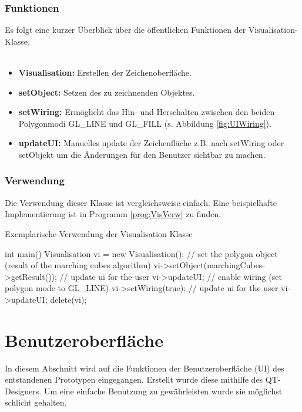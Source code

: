 \subsubsection{Funktionen}
Es folgt eine kurzer Überblick über die öffentlichen Funktionen der Visualisation-Klasse.\\
\\
\begin{itemize}
	\item \textbf{Visualisation:} Erstellen der Zeichenoberfläche.
	\item \textbf{setObject:} Setzen des zu zeichnenden Objektes.
	\item \textbf{setWiring:} Ermöglicht das Hin- und Herschalten zwischen den beiden Polygonmodi GL\_LINE und GL\_FILL (s. Abbildung \ref{fig:UIWiring}).
	\item \textbf{updateUI:} Manuelles update der Zeichenfläche z.B. nach setWiring oder setObjekt um die Änderungen für den Benutzer sichtbar zu machen.
\end{itemize}
\subsubsection{Verwendung}
Die Verwendung dieser Klasse ist vergleichsweise einfach. Eine beispielhafte Implementierung ist in Programm \ref{prog:VisVerw} zu finden.
\begin{program}[H]
	\caption{Exemplarische Verwendung der Visualisation Klasse}
	\label{prog:VisVerw}
	\begin{CCode}
		int main(){
			Visualisation vi = new Visualisation();
			// set the polygon object (result of the marching cubes algorithm)
			vi->setObject(marchingCubes->getResult());
			// update ui for the user
			vi->updateUI;
			// enable wiring (set polygon mode to GL\_LINE)
			vi->setWiring(true);
			// update ui for the user
			vi->updateUI;
			delete(vi);
		} 
	\end{CCode}
\end{program}

\section{Benutzeroberfläche}
In diesem Abschnitt wird auf die Funktionen der Benutzeroberfläche (UI) des entstandenen Prototypen eingegangen. Erstellt wurde diese mithilfe des QT-Designers. Um eine einfache Benutzung zu gewährleisten wurde sie möglichst schlicht gehalten.

